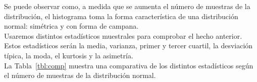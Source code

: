 \documentclass[12pt,a4paper,twoside,openright,titlepage,final]{article}
\begin{document}
Se puede observar como, a medida que se aumenta el número de muestras de la distribución, el histograma toma la forma característica de una distribución normal: simétrica y con forma de campana.\\

Usaremos distintos estadísticos muestrales para comprobar el hecho anterior. Estos estadísticos serán la media, varianza, primer y tercer cuartil, la desviación típica, la moda, el kurtosis y la asimetría. \\

La Tabla~\ref{tbl:comp} muestra una comparativa de los distintos estadísticos según el número de muestras de la distribución normal.\\

\begin{table}[htbp!]
\centering
\caption{Comparativa de distintos parámetros muestrales de tres distribuciones normales con distinto número de muestras}
\label{tbl:comp}
\end{table}
\end{document}
